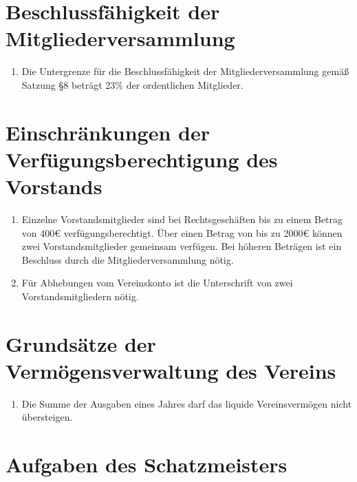 \documentclass[fontsize=12pt,paper=a4,pagesize,headings=small]{scrartcl}
\begin{document}
\section{Beschlussfähigkeit der Mitgliederversammlung}

\begin{enumerate}
    \item Die Untergrenze für die Beschlussfähigkeit der Mitgliederversammlung
        gemäß Satzung §8 beträgt 23\% der ordentlichen Mitglieder.
\end{enumerate}

\section{Einschränkungen der Verfügungsberechtigung des Vorstands}

\begin{enumerate}
    \item Einzelne Vorstandsmitglieder sind bei Rechtsgeschäften bis zu
        einem Betrag von 400\euro{} verfügungsberechtigt. Über einen Betrag
        von bis zu 2000\euro{} können zwei Vorstandsmitglieder gemeinsam
        verfügen. Bei höheren Beträgen ist ein Beschluss durch die
        Mitgliederversammlung nötig.

    \item Für Abhebungen vom Vereinskonto ist die Unterschrift von zwei
        Vorstandsmitgliedern nötig.

\end{enumerate}

\section{Grundsätze der Vermögensverwaltung des Vereins}

\begin{enumerate}
    \item Die Summe der Ausgaben eines Jahres darf das liquide
            Vereinsvermögen nicht übersteigen.
\end{enumerate}

\section{Aufgaben des Schatzmeisters}
\end{document}
